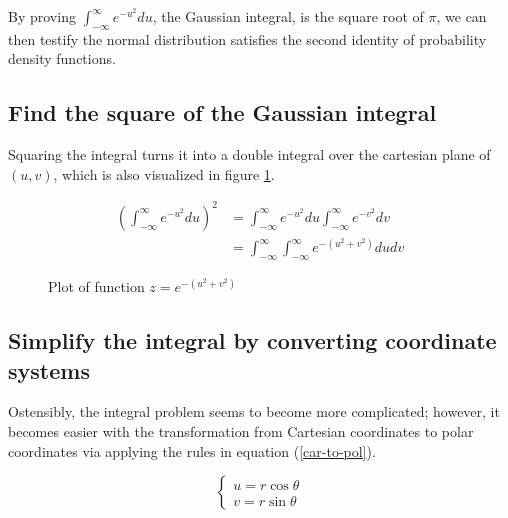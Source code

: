 By proving $\int_{-\infty}^\infty e^{-u^2}du$, the Gaussian integral, is the
square root of $\pi$, we can then testify the normal distribution satisfies the
second identity of probability density functions.

\subsection{Find the square of the Gaussian integral}

Squaring the integral turns it into a double integral over the
cartesian plane of $(u,v)$, which is also visualized in figure \ref{gauss-3d}.

$$
\begin{aligned}
	\left(\int_{-\infty}^\infty e^{-u^2}du\right)^2
	&=\int_{-\infty}^\infty e^{-u^2}du\int_{-\infty}^\infty e^{-v^2}dv \\
	&=\int_{-\infty}^\infty\int_{-\infty}^\infty e^{-(u^2+v^2)}dudv
\end{aligned}
$$

\begin{figure}[ht]
	\caption{Plot of function $z=e^{-(u^2+v^2)}$}\label{gauss-3d}
\end{figure}

\subsection{Simplify the integral by converting coordinate systems}

Ostensibly, the integral problem seems to become more complicated; however, it
becomes easier with the transformation from Cartesian coordinates to polar
coordinates via applying the rules in equation (\ref{car-to-pol}).

\begin{equation}
	\begin{cases}
		u=r\cos\theta \\
		v=r\sin\theta
	\end{cases}
	\label{car-to-pol}
\end{equation}

